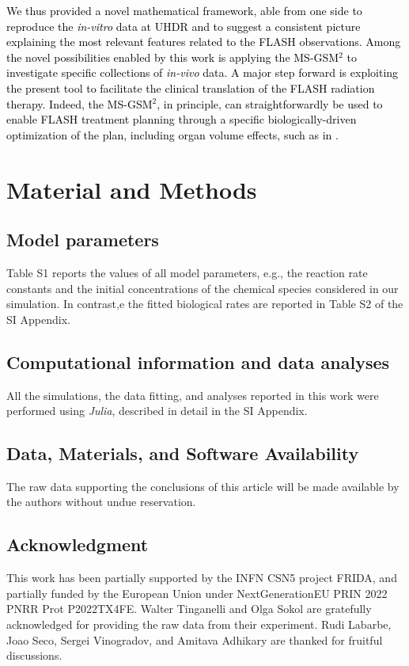 \documentclass[10pt]{iopart}
\newcommand{\marco}[1]{\textcolor{black}{#1}}
\numberwithin{table}{section}
\begin{document}
\marco{We thus provided a novel mathematical framework, able from one side to reproduce the \textit{in-vitro} data at UHDR and to suggest a consistent picture explaining the most relevant features related to the FLASH observations. Among the novel possibilities enabled by this work is applying the MS-GSM$^2$ to investigate specific collections of \textit{in-vivo} data. A major step forward is exploiting the present tool to facilitate the clinical translation of the FLASH radiation therapy. Indeed, the MS-GSM$^2$, in principle, can straightforwardly be used to enable FLASH treatment planning through a specific biologically-driven optimization of the plan, including organ volume effects, such as in \cite{battestini2022including}.}


\section*{Material and Methods}
\subsection*{Model parameters}
Table S1 reports the values of all model parameters, e.g., the reaction rate constants and the initial concentrations of the chemical species considered in our simulation. In contrast,e the fitted biological rates are reported in Table S2 of the SI Appendix.

\subsection*{Computational information and data analyses}
All the simulations, the data fitting, and analyses reported in this work were performed using \textit{Julia}, described in detail in the SI Appendix.



\subsection*{Data, Materials, and Software Availability}
The raw data supporting the conclusions of this article will be made available by the authors without undue reservation. 

\subsection*{Acknowledgment}
This work has been partially supported by the INFN CSN5 project FRIDA, and partially funded by the European Union under NextGenerationEU PRIN 2022 PNRR Prot P2022TX4FE. Walter Tinganelli and Olga Sokol are gratefully acknowledged for providing the raw data from their experiment. Rudi Labarbe, Joao Seco, Sergei Vinogradov, and Amitava Adhikary are thanked for
fruitful discussions.
\end{document}
